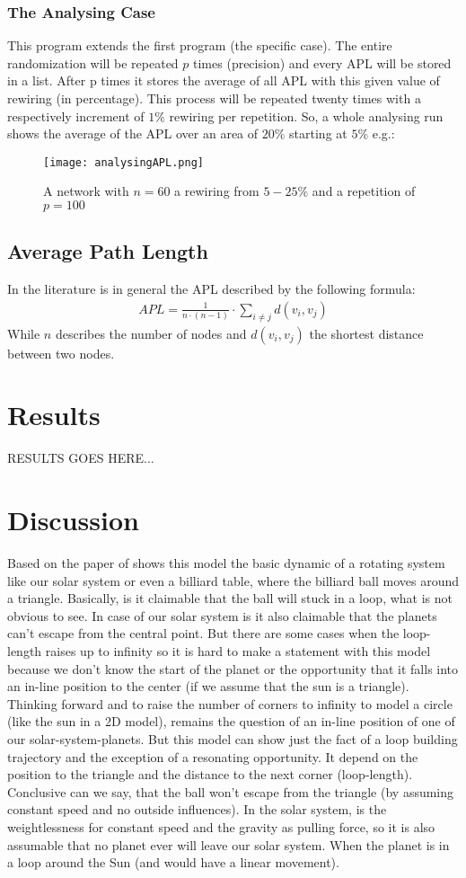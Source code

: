 \documentclass[11pt,a4paper]{article}
\begin{document}
\subsubsection{The Analysing Case}
This program extends the first program (the specific case). The entire randomization will be repeated \(p\) times (precision) and every APL will be stored in a list. After p times it stores the average of all APL with this given value of rewiring (in percentage). This process will be repeated twenty times with a respectively increment of \(1\%\) rewiring per repetition. So, a whole analysing run shows the average of the APL over an area of \(20\%\) starting at \(5\%\) e.g.:
\begin{figure}[h]
\centering
\texttt{[image: analysingAPL.png]}
\caption{A network with \(n=60\) a rewiring from \(5-25\%\) and a repetition of \(p=100\)}
\end{figure}
\subsection{Average Path Length}
In the literature is in general the APL described by the following formula\cite{apl}:
\begin{align}
APL=\frac{1}{n\cdot(n-1)} \cdot \sum \limits_{i\neq j} d(v_i,v_j)
\end{align}
While \(n\) describes the number of nodes and \(d(v_i,v_j)\) the shortest distance between two nodes.

\section{Results}
RESULTS GOES HERE...
\section{Discussion}
Based on the paper of shows this model the basic dynamic of a rotating system like our solar system or even a billiard table, where the billiard ball moves around a triangle. Basically, is it claimable that the ball will stuck in a loop, what is not obvious to see. In case of our solar system is it also claimable that the planets can’t escape from the central point. But there are some cases when the loop-length raises up to infinity so it is hard to make a statement with this model because we don’t know the start of the planet or the opportunity that it falls into an in-line position to the center (if we assume that the sun is a triangle). Thinking forward and to raise the number of corners to infinity to model a circle (like the sun in a 2D model), remains the question of an in-line position of one of our solar-system-planets. But this model can show just the fact of a loop building trajectory and the exception of a resonating opportunity. It depend on the position to the triangle and the distance to the next corner (loop-length). Conclusive can we say, that the ball won't escape from the triangle (by assuming constant speed and no outside influences). In the solar system, is the weightlessness for constant speed and the gravity as pulling force, so it is also assumable that no planet ever will leave our solar system. When the planet is in a loop around the Sun (and would have a linear movement).
\end{document}
